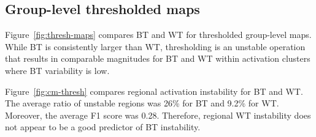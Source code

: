 \documentclass[conference]{IEEEtran}
\begin{document}
  
  \begin{figure}[ht]
  \end{figure}

  \subsection{Group-level thresholded maps}

  Figure~\ref{fig:thresh-maps} compares BT and WT for thresholded group-level maps.
  While BT is consistently larger than WT, thresholding is an unstable operation 
  that results in comparable magnitudes for BT and WT within activation clusters where BT variability is low. 

  Figure~\ref{fig:cm-thresh} compares regional activation instability for BT and WT. The average ratio
  of unstable regions was 26\% for BT and 9.2\% for WT. Moreover, the average F1 score was 0.28. Therefore, regional 
  WT instability does not appear to be a 
  good predictor of BT instability.
  
\end{document}
